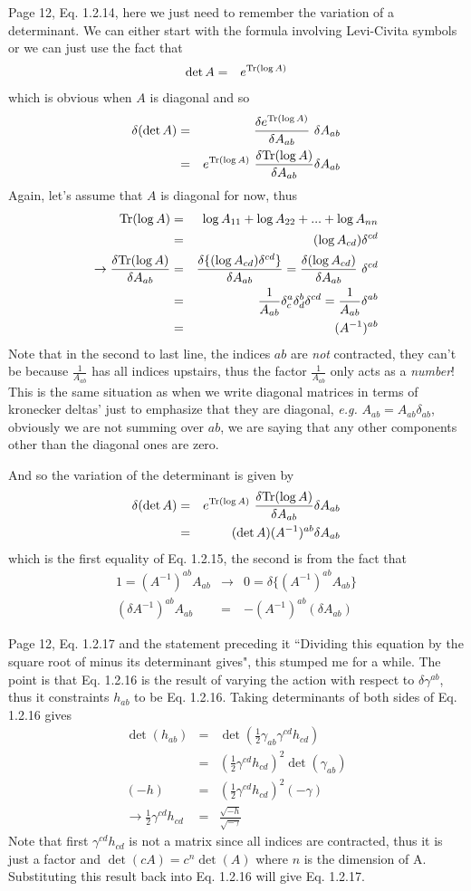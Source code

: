 \documentclass[aps,preprint,preprintnumbers,nofootinbib,showpacs,prd]{revtex4-1}
\newcommand{\eg}{{\it e.g.} }
\newcommand{\nbea}{\begin{eqnarray*}}
\newcommand{\neea}{\end{eqnarray*}}
\newcommand{\tr}{{\rm Tr}}
\begin{document}
Page 12, Eq. 1.2.14, here we just need to remember the variation of a determinant. We can either start with the formula involving Levi-Civita symbols or we can just use the fact that
%
\nbea
\det A & = & e^ {\tr ( \log A )}
\neea
%
which is obvious when $A$ is diagonal and so
%
\nbea
\delta ( \det A ) & = & \frac{\delta e^ {\tr ( \log A )}} {\delta A_{ab}} ~\delta A_{ab} \\
& = & e^ {\tr ( \log A )} ~\frac{\delta \tr ( \log A )} {\delta A_{ab}} \delta A_{ab}
\neea
%
Again, let's assume that $A$ is diagonal for now, thus
%
\nbea
\tr ( \log A ) & = & \log A_{11} + \log A_{22} + ... + \log A_{nn} \\
& = & (\log A_{cd}) \delta^{cd} \\
\rightarrow \frac{\delta \tr ( \log A )} {\delta A_{ab}} & = & \frac{\delta \{ (\log A_{cd}) \delta^{cd} \} } {\delta A_{ab}} =\frac{\delta (\log A_{cd}) } {\delta A_{ab}} ~ \delta^{cd}\\
& = & \frac{1}{A_{ab}} \delta^a_c \delta^b_d \delta^{cd} = \frac{1}{A_{ab}} \delta^{ab} \\
& = & (A^{-1})^{ab}
\neea
%
Note that in the second to last line, the indices $ab$ are {\it not} contracted, they can't be because $\frac{1}{A_{ab}}$ has all indices upstairs, thus the factor $\frac{1}{A_{ab}}$ only acts as a {\it number}! This is the same situation as when we write diagonal matrices in terms of kronecker deltas' just to emphasize that they are diagonal, \eg $A_{ab} = A_{ab} \delta_{ab}$, obviously we are not summing over $ab$, we are saying that any other components other than the diagonal ones are zero.

And so the variation of the determinant is given by
%
\nbea
\delta ( \det A ) & = & e^ {\tr ( \log A )} ~\frac{\delta \tr ( \log A )} {\delta A_{ab}} \delta A_{ab} \\
& = & ( \det A )  (A^{-1})^{ab} \delta A_{ab}
\neea
%
which is the first equality of Eq. 1.2.15, the second is from the fact that
%
\nbea
1 = (A^{-1})^{ab} A_{ab} & \rightarrow & 0 = \delta \{ (A^{-1})^{ab} A_{ab} \} \\
(\delta A^{-1})^{ab} A_{ab} & = & - (A^{-1})^{ab} (\delta A_{ab} )
\neea
%

Page 12, Eq. 1.2.17 and the statement preceding it ``Dividing this equation by the square root of minus its determinant gives", this stumped me for a while. The point is that Eq. 1.2.16 is the result of varying the action with respect to $\delta \gamma^{ab}$, thus it constraints $h_{ab}$ to be Eq. 1.2.16. Taking determinants of both sides of Eq. 1.2.16 gives
%
\nbea
\det (h_{ab}) & = & \det \left ( \frac{1}{2} \gamma_{ab} \gamma^{cd} h_{cd} \right ) \\
& = &  \left ( \frac{1}{2} \gamma^{cd} h_{cd} \right )^2 \det (\gamma_{ab})\\
(-h) & = & \left ( \frac{1}{2} \gamma^{cd} h_{cd} \right )^2 (-\gamma) \\
\rightarrow \frac{1}{2} \gamma^{cd} h_{cd} & = & \frac{\sqrt{-h}}{\sqrt{-\gamma}}
\neea
%
Note that first $\gamma^{cd} h_{cd}$ is not a matrix since all indices are contracted, thus it is just a factor and $\det (c A) = c^{n} \det (A)$ where $n$ is the dimension of A. Substituting this result back into Eq. 1.2.16 will give Eq. 1.2.17.
\end{document}
